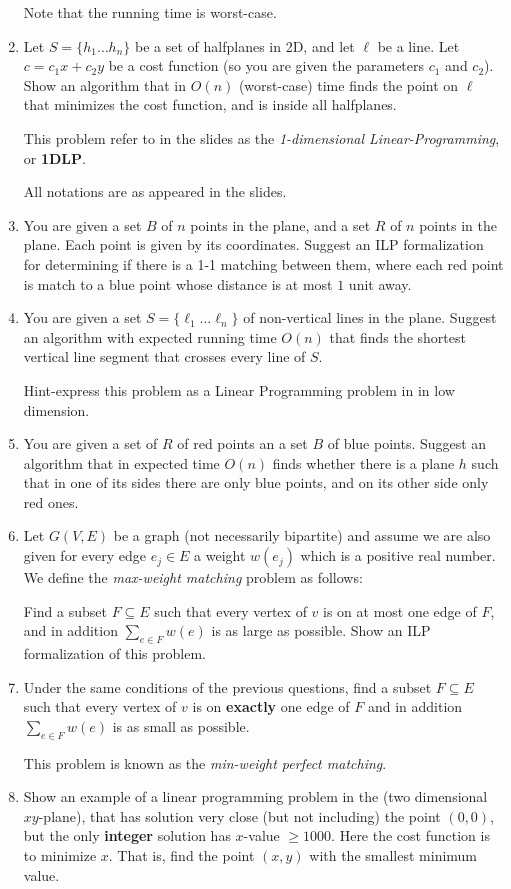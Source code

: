 \documentclass[11pt,epic,leqno,eepic,psfig,]{article}
\renewcommand{\i}{\item}
\begin{document}
\begin{enumerate}
Note that the running time is worst-case. 



\i Let $S=\{h_1\dots h_n\}$ be a set of halfplanes in 2D, and let $\ell$ be a line.
Let $c=c_1x+c_2y$ be a cost function (so you are given the parameters $c_1$ and $c_2$).
Show an algorithm that in $O(n)$ (worst-case) time finds the point on $\ell$ that minimizes the cost function, and is inside all halfplanes. 

This problem refer to in the slides as the {\em 1-dimensional Linear-Programming}, or  {\bf 1DLP}. 

All notations are as appeared in the slides. 

\item You are given a set $B$ of $n$ points in the plane, and a set $R$ of $n$ points in the plane. Each point  is given by  its coordinates.  Suggest an ILP  formalization  for determining if there is a 1-1 matching between them, where each red point is match to a blue point whose distance is at most $1$ unit away.

\i You are given a set $S=\{\ell_1\dots \ell_n\}$ of non-vertical 
lines in the plane. Suggest an algorithm with expected running time $O(n)$  that finds the shortest vertical line segment that crosses every line of $S$. 

Hint-express this problem as a Linear Programming problem in  in low dimension.


\i You are given a set of $R$ of red points an a set $B$ of blue points. Suggest an algorithm that in expected time  $O(n)$ finds whether there is a plane $h$  such that in one of its sides there are only blue points, and on its other side only red ones. 


\i Let $G(V,E)$ be a graph (not necessarily bipartite) and assume we are also given for every edge $e_j\in E$ a weight $w(e_j )$ which is a positive real number. We define the {\em max-weight matching} problem as follows: 

Find a subset $F\subseteq E$ such that every vertex of $v$ is on at most one edge of $F$, and in addition $\sum_{e\in F} w(e)$ is as large as possible.  
 Show an ILP formalization of this problem. 

\i Under the same conditions of the previous questions, 
find a subset $F\subseteq E$ such that every vertex of $v$ is on {\bf exactly}  one edge of $F$ and in addition $\sum_{e\in F} w(e)$ is as small as possible.

This problem is known as the {\em  min-weight perfect matching}.

\i Show an example of a linear programming problem in the (two dimensional $xy$-plane), that has  solution very close (but not including) the point $(0,0)$, 
 but the only {\bf integer} solution has $x$-value $\geq 1000.$ Here the cost function is to minimize $x$. That is, find the point $(x,y)$ with the smallest minimum value.  



\end{enumerate} 
\end{document}
